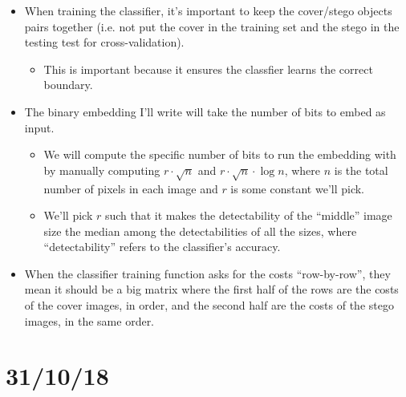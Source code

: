 \documentclass[11pt,a4paper]{report}
\begin{document}
\begin{itemize}
\item When training the classifier, it's important to keep the cover/stego objects pairs together (i.e. not put the cover in the training set and the stego in the testing test for cross-validation).
  \begin{itemize}
  \item This is important because it ensures the classfier learns the correct boundary.
  \end{itemize}

\item The binary embedding I'll write will take the number of bits to embed as input.
  \begin{itemize}
  \item We will compute the specific number of bits to run the embedding with by manually computing $r \cdot \sqrt{n}$ and $r \cdot \sqrt{n} \cdot \log n$, where $n$ is the total number of pixels in each image and $r$ is some constant we'll pick.
  \item We'll pick $r$ such that it makes the detectability of the ``middle'' image size the median among the detectabilities of all the sizes, where ``detectability'' refers to the classifier's accuracy.
  \end{itemize}

\item When the classifier training function asks for the costs ``row-by-row'', they mean it should be a big matrix where the first half of the rows are the costs of the cover images, in order, and the second half are the costs of the stego images, in the same order.

\end{itemize}


\section{31/10/18}
\end{document}
